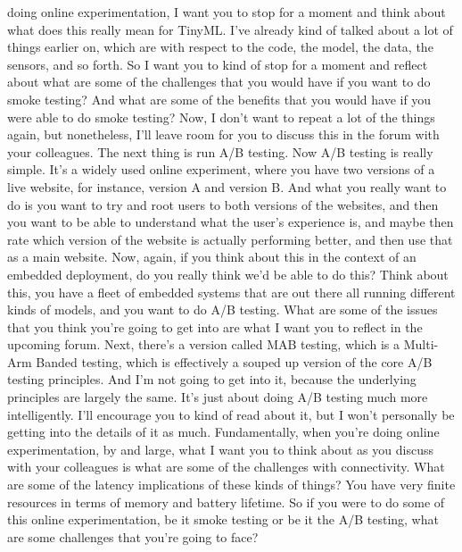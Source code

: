 {{{{    doing online experimentation, I want you to stop for a moment
    and think about what does this really mean for TinyML.
    I've already kind of talked about a lot of things
    earlier on, which are with respect to the code, the model, the data,
    the sensors, and so forth.
    So I want you to kind of stop for a moment
    and reflect about what are some of the challenges
    that you would have if you want to do smoke testing?
    And what are some of the benefits that you would have
    if you were able to do smoke testing?
    Now, I don't want to repeat a lot of the things again,
    but nonetheless, I'll leave room for you to discuss this in the forum
    with your colleagues.
    The next thing is run A/B testing.
    Now A/B testing is really simple.
    It's a widely used online experiment, where
    you have two versions of a live website, for instance, version A and version B.
    And what you really want to do is you want to try and root users
    to both versions of the websites, and then
    you want to be able to understand what the user's experience is, and maybe
    then rate which version of the website is actually performing better,
    and then use that as a main website.
    Now, again, if you think about this in the context of an embedded deployment,
    do you really think we'd be able to do this?
    Think about this, you have a fleet of embedded systems
    that are out there all running different kinds of models,
    and you want to do A/B testing.
    What are some of the issues that you think you're going to get into
    are what I want you to reflect in the upcoming forum.
    Next, there's a version called MAB testing, which is a Multi-Arm Banded
    testing, which is effectively a souped up version of the core A/B testing
    principles.
    And I'm not going to get into it, because the underlying principles are
    largely the same.
    It's just about doing A/B testing much more intelligently.
    I'll encourage you to kind of read about it,
    but I won't personally be getting into the details of it as much.
    Fundamentally, when you're doing online experimentation,
    by and large, what I want you to think about
    as you discuss with your colleagues is what are some
    of the challenges with connectivity.
    What are some of the latency implications of these kinds of things?
    You have very finite resources in terms of memory and battery lifetime.
    So if you were to do some of this online experimentation,
    be it smoke testing or be it the A/B testing,
    what are some challenges that you're going to face?
}}}}
